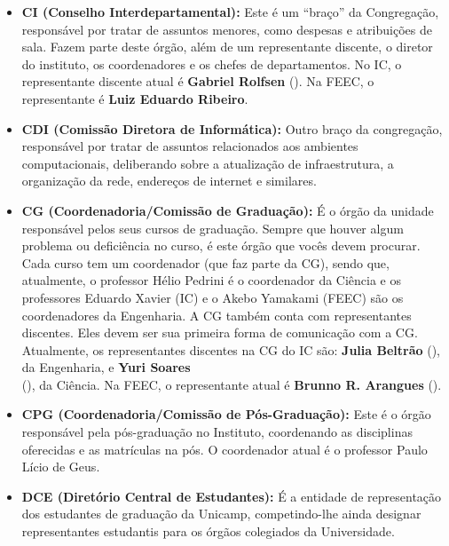 \begin{itemize}
    \item  \textbf{CI (Conselho Interdepartamental):} Este é um ``braço'' da
        Congregação, responsável por tratar de assuntos menores, como despesas e
        atribuições de sala. Fazem parte deste órgão, além de um representante
        discente, o diretor do instituto, os coordenadores e os chefes de
        departamentos. No IC, o representante discente atual é \textbf{Gabriel
        Rolfsen} (). Na FEEC, o representante
        é \textbf{Luiz Eduardo Ribeiro}.

    \item  \textbf{CDI (Comissão Diretora de Informática):} Outro braço da
        congregação, responsável por tratar de assuntos relacionados aos
        ambientes computacionais, deliberando sobre a atualização de
        infraestrutura, a organização da rede, endereços de internet e
        similares.

    \item  \textbf{CG (Coordenadoria/Comissão de Graduação):} É o órgão da
        unidade responsável pelos seus cursos de graduação. Sempre que houver
        algum problema ou deficiência no curso, é este órgão que vocês devem
        procurar.  Cada curso tem um coordenador (que faz parte da CG), sendo
        que, atualmente, o professor Hélio Pedrini é o coordenador da Ciência e
        os professores Eduardo Xavier (IC) e o Akebo Yamakami (FEEC) são os
        coordenadores da Engenharia. A CG também conta com representantes
        discentes. Eles devem ser sua primeira forma de comunicação com a CG.
        Atualmente, os representantes discentes na CG do IC são: \textbf{Julia
        Beltrão} (), da Engenharia, e
        \textbf{Yuri Soares}\\(), da
        Ciência. Na FEEC, o representante atual é \textbf{Brunno R. Arangues}
        ().

    \item  \textbf{CPG (Coordenadoria/Comissão de Pós-Graduação):} Este é o
        órgão responsável pela pós-graduação no Instituto, coordenando as
        disciplinas oferecidas e as matrículas na pós. O coordenador atual é o
        professor Paulo Lício de Geus.

    \item  \textbf{DCE (Diretório Central de Estudantes):} É a entidade de
        representação dos estudantes de graduação da Unicamp, competindo-lhe
        ainda designar representantes estudantis para os órgãos colegiados da
        Universidade.


\end{itemize}
